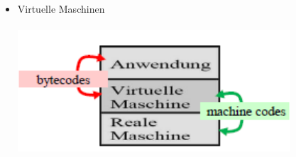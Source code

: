 \begin{minipage}{0.3\textwidth}
    \begin{itemize}
        \item Virtuelle Maschinen\\\\
        \includegraphics[width=0.8\textwidth]{images/Betriebssysteme/Virtuelle_Maschinen.png} \\ \\ \\ \\ \\ \\ \\ \\ \\ \\ \\ \\ \\
    \end{itemize}
\end{minipage}

